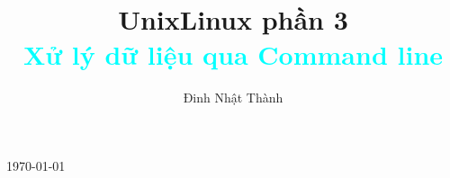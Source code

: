 \documentclass[11pt]{article}
\title{{UnixLinux phần 3}\\[0.5em]\textcolor{cyan}{Xử lý dữ liệu qua Command line}}
\author{Đinh Nhật Thành}
\date{}
\renewcommand{\maketitle}{}
\begin{document}
\maketitle

\begin{titlepage}
    \centering
    \vspace*{\fill}

    {\Huge \textbf{\thetitle} \par}
    \vspace{2em}

    {\Large \textbf{\theauthor} \par}
    \vspace{1em}

    {\large \today \par}

    \vspace*{\fill}
    \thispagestyle{fancy}
\end{titlepage}

\newpage
\tableofcontents
\thispagestyle{fancy}


\newpage

\renewcommand{\thesubsection}{\arabic{subsection}}
\newpage
\end{document}
